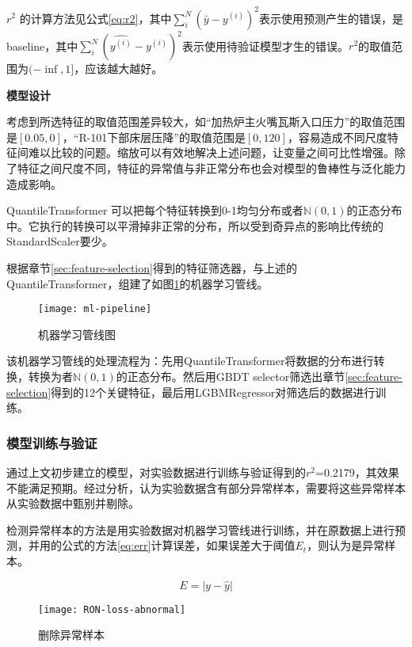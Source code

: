 \documentclass[bwprint]{gmcmthesis}
\begin{document}
$r^2$ 的计算方法见公式\eqref{eq:r2}，其中$\sum_i^N(\bar{y}-y^{(i)})^2$表示使用预测产生的错误，是baseline，其中$\sum_i^N(\hat{y^{(i)}}-y^{(i)})^2$表示使用待验证模型才生的错误。$r^2$的取值范围为$(-\inf, 1]$，应该越大越好。


\textbf{模型设计}


考虑到所选特征的取值范围差异较大，如“加热炉主火嘴瓦斯入口压力”的取值范围是$[0.05, 0]$，“R-101下部床层压降”的取值范围是$[0, 120]$，容易造成不同尺度特征间难以比较的问题。缩放可以有效地解决上述问题，让变量之间可比性增强。除了特征之间尺度不同，特征的异常值与非正常分布也会对模型的鲁棒性与泛化能力造成影响。

QuantileTransformer 可以把每个特征转换到0-1均匀分布或者$\mathbb{N}(0,1)$的正态分布中。它执行的转换可以平滑掉非正常的分布，所以受到奇异点的影响比传统的StandardScaler要少。


根据章节\ref{sec:feature-selection}得到的特征筛选器，与上述的QuantileTransformer，组建了如图\ref{img:ml-pipeline}的机器学习管线。

\begin{figure}[htb]
	\centering
	\texttt{[image: ml-pipeline]}
	\caption{机器学习管线图}
	\label{img:ml-pipeline}
\end{figure}

该机器学习管线的处理流程为：先用QuantileTransformer将数据的分布进行转换，转换为者$\mathbb{N}(0,1)$的正态分布。然后用GBDT selector筛选出章节\ref{sec:feature-selection}得到的12个关键特征，最后用LGBMRegressor对筛选后的数据进行训练。

\FloatBarrier
\subsubsection{模型训练与验证}

通过上文初步建立的模型，对实验数据进行训练与验证得到的$r^2$=0.2179，其效果不能满足预期。经过分析，认为实验数据含有部分异常样本，需要将这些异常样本从实验数据中甄别并剔除。

检测异常样本的方法是用实验数据对机器学习管线进行训练，并在原数据上进行预测，并用的公式的方法\ref{eq:err}计算误差，如果误差大于阈值$E_t$，则认为是异常样本。

\begin{equation}\label{eq:err}
	E=|y-\hat{y}|
\end{equation}


\begin{figure}[htb]
	\centering
	\texttt{[image: RON-loss-abnormal]}
	\caption{删除异常样本}
	\label{img:abnormal}
\end{figure}
\end{document}
